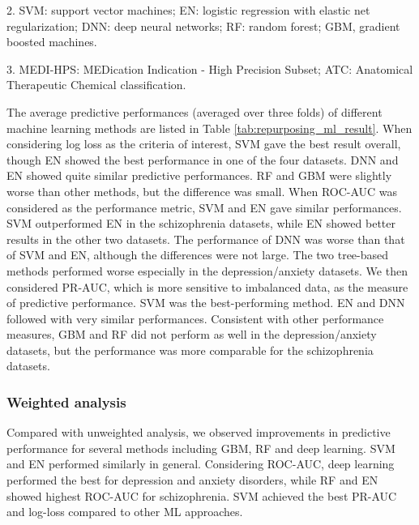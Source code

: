 \begin{table}[htbp]
\begin{threeparttable}
\begin{tablenotes}
            \item 2. SVM: support vector machines; EN: logistic regression with elastic net regularization; DNN: deep neural networks; RF: random forest; GBM, gradient boosted machines. 
            \item 3. MEDI-HPS: MEDication Indication - High Precision Subset; ATC: Anatomical Therapeutic Chemical classification. 
          \end{tablenotes}
        \end{threeparttable}  
        \label{tab:repurposing_ml_result}%
      \end{table}%

      The average predictive performances (averaged over three folds) of different machine learning methods are listed in Table \ref{tab:repurposing_ml_result}. When considering log loss as the criteria of interest, SVM gave the best result overall, though EN showed the best performance in one of the four datasets. DNN and EN showed quite similar predictive performances. RF and GBM were slightly worse than other methods, but the difference was small. 
      When ROC-AUC was considered as the performance metric, SVM and EN gave similar performances. SVM outperformed EN in the schizophrenia datasets, while EN showed better results in the other two datasets. The performance of DNN was worse than that of SVM and EN, although the differences were not large. The two tree-based methods performed worse especially in the depression/anxiety datasets.
      We then considered PR-AUC, which is more sensitive to imbalanced data, as the measure of predictive performance. SVM was the best-performing method. EN and DNN followed with very similar performances. Consistent with other performance measures, GBM and RF did not perform as well in the depression/anxiety datasets, but the performance was more comparable for the schizophrenia datasets.

    \subsubsection{Weighted analysis} 
      Compared with unweighted analysis, we observed improvements in predictive performance for several methods including GBM, RF and deep learning. SVM and EN performed similarly in general. Considering ROC-AUC, deep learning performed the best for depression and anxiety disorders, while RF and EN showed highest ROC-AUC for schizophrenia. SVM achieved the best PR-AUC and log-loss compared to other ML approaches.

